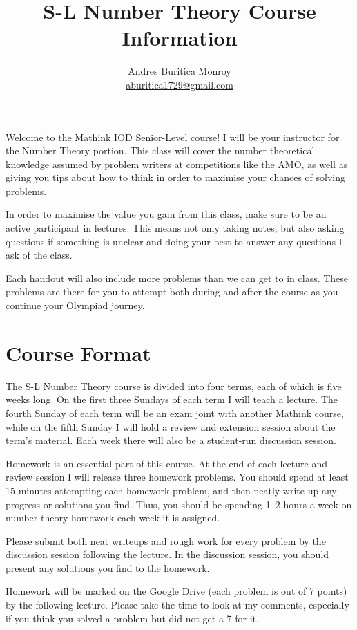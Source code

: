 \documentclass{article}
\title{S-L Number Theory Course Information}
\author{Andres Buritica Monroy \\
	\href{mailto:aburitica1729@gmail.com}{aburitica1729@gmail.com}}
\date{}
\begin{document}
\maketitle
Welcome to the Mathink IOD Senior-Level course! I will be your instructor for the
Number Theory portion. This class will cover the number theoretical knowledge
assumed by problem writers at competitions like the AMO, as well as giving you
tips about how to think in order to maximise your chances of solving problems.

In order to maximise the value you gain from this class, make sure to be an
active participant in lectures. This means not only taking notes, but also
asking questions if something is unclear and doing your best to answer any
questions I ask of the class.

Each handout will also include more problems than we can get to in class. These
problems are there for you to attempt both during and after the course as you
continue your Olympiad journey.
\section{Course Format}
The S-L Number Theory course is divided into four terms, each of which is five
weeks long. On the first three Sundays of each term I will teach a lecture. The
fourth Sunday of each term will be an exam joint with another Mathink course,
while on the fifth Sunday I will hold a review and extension session about the
term's material. Each week there will also be a student-run discussion session.

Homework is an essential part of this course. At the end of each lecture and
review session I will release three homework problems. You should spend at
least 15 minutes attempting each homework problem, and then neatly write up any
progress or solutions you find. Thus, you should be spending 1--2 hours a week
on number theory homework each week it is assigned.

Please submit both neat writeups and rough work
for every problem by the discussion session following the lecture. In the
discussion session, you should present any solutions you find to the homework.

Homework will be marked on the Google Drive (each problem is out of 7 points)
by the following lecture. Please
take the time to look at my comments, especially if you think you solved a
problem but did not get a 7 for it.
\newpage
\end{document}
